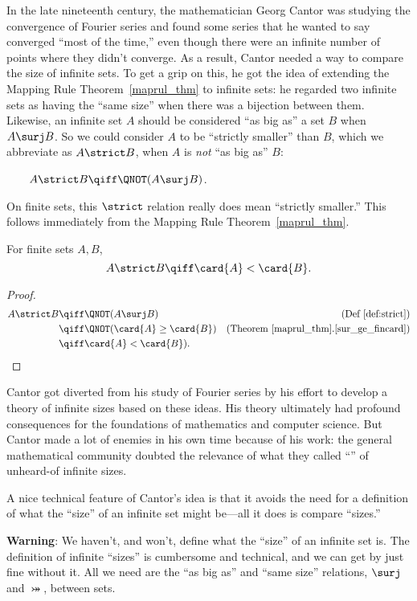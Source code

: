 In the late nineteenth century, the mathematician Georg Cantor was
studying the convergence of Fourier series and found some series that
he wanted to say converged ``most of the time,'' even though there
were an infinite number of points where they didn't converge.  As a
result, Cantor needed a way to compare the size of infinite sets.  To
get a grip on this, he got the idea of extending the Mapping Rule
Theorem~\ref{maprul_thm} to infinite sets: he regarded two infinite
sets as having the ``same size'' when there was a bijection between
them.  Likewise, an infinite set $A$ should be considered ``as big
as'' a set $B$ when $A \surj B$.  So we could consider $A$ to be
``strictly smaller'' than $B$, which we abbreviate as $A \strict B$,
when $A$ is \emph{not} ``as big as'' $B$:
\begin{definition}\label{def:strict}
$\qquad A \strict B  \qiff \QNOT(A \surj B)$.
\end{definition}
On finite sets, this $\strict$ relation really does mean ``strictly
smaller.''  This follows immediately from the Mapping
Rule Theorem~\ref{maprul_thm}.
\begin{corollary}\label{cor:strict}
For finite sets $A,B$,
\[
A \strict B  \qiff \card{A} < \card{B}. 
\]
\end{corollary}

\begin{proof}
\begin{align*}
A \strict B
  & \qiff \QNOT(A \surj B)
    & \text{(Def~\ref{def:strict})}\\
  & \qiff \QNOT(\card{A} \geq \card{B})
    & \text{(Theorem~\ref{maprul_thm}.\eqref{sur_ge_fincard})}\\
  & \qiff \card{A} < \card{B}).
\end{align*}
\end{proof}
Cantor got diverted from his study of Fourier series by his effort to
develop a theory of infinite sizes based on these ideas.  His theory
ultimately had profound consequences for the foundations of
mathematics and computer science.  But Cantor made a lot of enemies in
his own time because of his work: the general mathematical community
doubted the relevance of what they called ``''
of unheard-of infinite sizes.

A nice technical feature of Cantor's idea is that it avoids the need
for a definition of what the ``size'' of an infinite set might
be---all it does is compare ``sizes.''

\textbf{Warning}: We haven't, and won't, define what
the ``size'' of an infinite set is.  The definition of infinite ``sizes''
is cumbersome and technical, and we can get by just fine without it.
All we need are the ``as big as'' and ``same size'' relations, $\surj$
and $\bij$, between sets.

